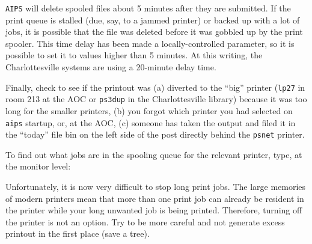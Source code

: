      {\tt AIPS} will delete spooled files about 5 minutes after they
are submitted.  If the print queue is stalled (due, say, to a jammed
printer) or backed up with a lot of jobs, it is possible that the file
was deleted before it was gobbled up by the print spooler.  This time
delay has been made a locally-controlled parameter, so it is possible
to set it to values higher than 5 minutes.  At this writing, the
Charlottesville systems are using a 20-minute delay time.

     Finally, check to see if the printout was (a) diverted to the
``big'' printer ({\tt lp27} in room 213 at the AOC or {\tt ps3dup} in
the Charlottesville library) because it was too long for the smaller
printers, (b) you forgot which printer you had selected on {\tt aips}
startup, or, at the AOC, (c) someone has taken the output and filed
it in the ``today'' file bin on the left side of the post directly
behind the {\tt psnet} printer.


     To find out what jobs are in the spooling queue for the relevant
printer, type, at the monitor level:

     Unfortunately, it is now very difficult to stop long print jobs.
The large memories of modern printers mean that more than one print
job can already be resident in the printer while your long unwanted
job is being printed.  Therefore, turning off the printer is not an
option.  Try to be more careful and not generate excess printout in
the first place (save a tree).

